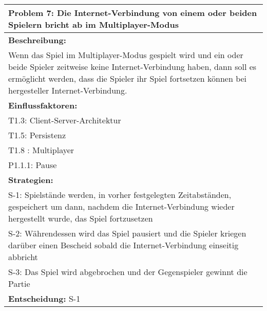 \documentclass[fontsize=12pt,paper=a4,twoside]{scrartcl}
\begin{document}
\begin{longtable}{|p{15cm}|}
\hline
Problem 7: Die Internet-Verbindung von einem oder beiden Spielern bricht ab im Multiplayer-Modus                                                                        
\\ \hline                                                                                                                                                                                                                                                                                                                                                                                                                                                                                                                                                        
\textbf{Beschreibung:} \\
Wenn das Spiel im Multiplayer-Modus gespielt wird und ein oder beide Spieler zeitweise keine Internet-Verbindung haben, 
dann soll es ermöglicht werden, dass die Spieler ihr Spiel fortsetzen können bei hergesteller Internet-Verbindung. 
\\ \hline
\textbf{Einflussfaktoren:} \\
T1.3: Client-Server-Architektur \\
T1.5: Persistenz \\
T1.8 : Multiplayer \\
P1.1.1: Pause
\\ \hline
\textbf{Strategien:} \\
S-1: Spielstände werden, in vorher festgelegten Zeitabständen, gespeichert um dann, nachdem die Internet-Verbindung wieder hergestellt wurde, das Spiel fortzusetzen\\
S-2: Währendessen wird das Spiel pausiert und die Spieler kriegen darüber einen Bescheid sobald die Internet-Verbindung einseitig abbricht \\
S-3: Das Spiel wird abgebrochen und der Gegenspieler gewinnt die Partie
 \\ \hline
 \textbf{Entscheidung:} S-1
\\ \hline
\end{longtable}
\end{document}
